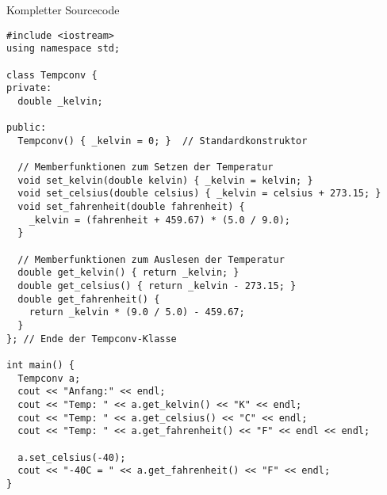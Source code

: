\documentclass[presentation]{beamer}
\begin{document}
\begin{frame}[label={sec:orgcc425ed},fragile]{Kompletter Sourcecode}
 \begin{verbatim}
#include <iostream>
using namespace std;

class Tempconv {
private:
  double _kelvin;

public:
  Tempconv() { _kelvin = 0; }  // Standardkonstruktor

  // Memberfunktionen zum Setzen der Temperatur
  void set_kelvin(double kelvin) { _kelvin = kelvin; }
  void set_celsius(double celsius) { _kelvin = celsius + 273.15; }
  void set_fahrenheit(double fahrenheit) {
    _kelvin = (fahrenheit + 459.67) * (5.0 / 9.0);
  }

  // Memberfunktionen zum Auslesen der Temperatur
  double get_kelvin() { return _kelvin; }
  double get_celsius() { return _kelvin - 273.15; }
  double get_fahrenheit() {
    return _kelvin * (9.0 / 5.0) - 459.67;
  }
}; // Ende der Tempconv-Klasse

int main() {
  Tempconv a;
  cout << "Anfang:" << endl;
  cout << "Temp: " << a.get_kelvin() << "K" << endl;
  cout << "Temp: " << a.get_celsius() << "C" << endl;
  cout << "Temp: " << a.get_fahrenheit() << "F" << endl << endl;

  a.set_celsius(-40);
  cout << "-40C = " << a.get_fahrenheit() << "F" << endl;
}
\end{verbatim}
\end{frame}
\end{document}
